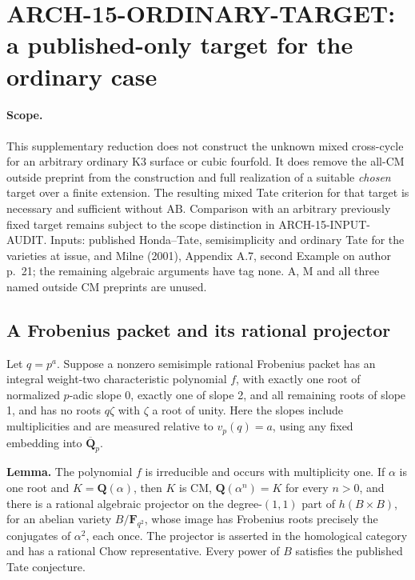 \section{ARCH-15-ORDINARY-TARGET: a published-only target for the ordinary case}
\label{arch15-ordinary-target}

\paragraph{Scope.}
This supplementary reduction does not construct the unknown mixed
cross-cycle for an arbitrary ordinary K3 surface or cubic fourfold.
It does remove the all-CM outside preprint from the construction and
full realization of a suitable \emph{chosen} target over a finite
extension. The resulting mixed Tate criterion for that target is
necessary and sufficient without \(\mathrm{AB}\). Comparison with an
arbitrary previously fixed target remains subject to the scope
distinction in ARCH-15-INPUT-AUDIT. Inputs: published Honda--Tate,
semisimplicity and ordinary Tate for the varieties at issue, and
Milne (2001), Appendix A.7, second Example on author p.~21; the
remaining algebraic arguments have tag none. A, M and all three named
outside CM preprints are unused.

\subsection{A Frobenius packet and its rational projector}

Let \(q=p^a\). Suppose a nonzero semisimple rational Frobenius packet
has an integral weight-two characteristic polynomial \(f\), with
exactly one root of normalized \(p\)-adic slope 0, exactly one of
slope 2, and all remaining roots of slope 1, and has no roots
\(q\zeta\) with \(\zeta\) a root of unity. Here the slopes include
multiplicities and are measured relative to \(v_p(q)=a\), using any
fixed embedding into \(\overline{\mathbf Q}_p\).

\textbf{Lemma.} The polynomial \(f\) is irreducible and occurs with
multiplicity one. If \(\alpha\) is one root and
\(K=\mathbf Q(\alpha)\), then \(K\) is CM,
\(\mathbf Q(\alpha^n)=K\) for every \(n>0\), and there is a rational
algebraic projector on the degree-\((1,1)\) part of
\(h(B\times B)\), for an abelian variety \(B/\mathbf F_{q^2}\), whose
image has Frobenius roots precisely the conjugates of \(\alpha^2\),
each once. The projector is asserted in the homological category and
has a rational Chow representative. Every power of \(B\) satisfies
the published Tate conjecture.


